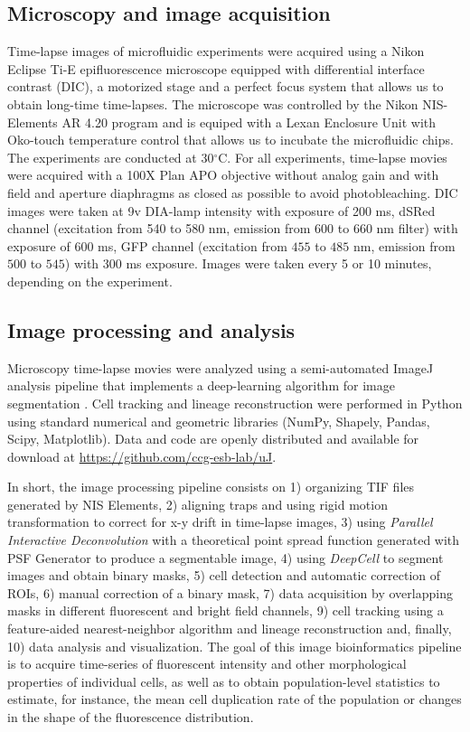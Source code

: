 \documentclass[fleqn,12pt]{wlscirep}
\begin{document}
\subsection{Microscopy and image acquisition}

Time-lapse images of microfluidic experiments were acquired using a Nikon Eclipse Ti-E epifluorescence microscope equipped with differential interface contrast (DIC), a motorized stage and a perfect focus system that allows us to obtain long-time time-lapses. The microscope was controlled by the Nikon NIS-Elements AR 4.20 program and is equiped with a Lexan Enclosure Unit with Oko-touch temperature control that allows us to incubate the microfluidic chips. The experiments are conducted at 30$^{\circ}$C.
For all experiments, time-lapse movies were acquired with a 100X Plan APO objective without analog gain and with field and aperture diaphragms as closed as possible to avoid photobleaching. DIC images were taken at 9v DIA-lamp intensity with exposure of 200 ms, dSRed channel (excitation from 540 to 580 nm, emission from $600$ to $660$ nm filter) with exposure of 600 ms, GFP channel (excitation from $455$ to $485$ nm, emission from $500$ to $545$) with $300$ ms exposure. Images were taken every 5 or 10 minutes, depending on the experiment. 


\subsection{Image processing and analysis}


Microscopy time-lapse movies were analyzed using a semi-automated ImageJ \cite{schneider2012nih} analysis pipeline that implements a deep-learning algorithm for image segmentation \cite{vanValen2016}.  Cell tracking and lineage reconstruction were performed in Python using standard numerical and geometric libraries (NumPy, Shapely, Pandas, Scipy, Matplotlib).  Data and code are openly distributed and available for download at \href{https://github.com/ccg-esb-lab/uJ}{https://github.com/ccg-esb-lab/uJ}.

 In short, the image processing pipeline consists on 1) organizing TIF files generated by NIS Elements, 2) aligning traps and using rigid motion transformation to correct for x-y drift in time-lapse images, 3) using {\em Parallel Interactive Deconvolution} with a theoretical point spread function generated with PSF Generator to produce a segmentable image, 4) using {\em DeepCell}\cite{vanValen2016} to segment images and obtain binary masks, 5) cell detection and automatic correction of ROIs, 6) manual correction of a binary mask, 7) data acquisition by overlapping masks in different fluorescent and bright field channels, 9) cell tracking using a feature-aided nearest-neighbor algorithm and lineage reconstruction and, finally, 10) data analysis and visualization.
The goal of this image bioinformatics pipeline is to acquire time-series of fluorescent intensity and other morphological properties of individual cells, as well as to obtain population-level statistics to estimate, for instance, the mean cell duplication rate of the population or changes in the shape of the fluorescence distribution.
\end{document}
